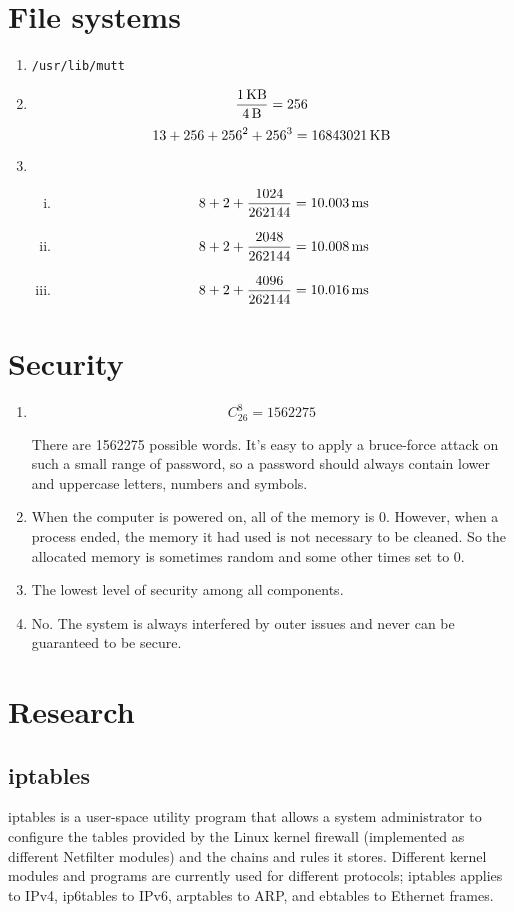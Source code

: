 \documentclass{article}
\newcommand{\unit}[1]{{\rm\,#1}}
\begin{document}
\section{File systems}
\begin{enumerate}
\item
\texttt{/usr/lib/mutt}
\item
$$\frac{1\unit{KB}}{4\unit{B}}=256$$
$$13+256+256^2+256^3=16843021\unit{KB}$$
\item
\begin{enumerate}[(i)]
\item $$8+2+\frac{1024}{262144}=10.003\unit{ms}$$
\item $$8+2+\frac{2048}{262144}=10.008\unit{ms}$$
\item $$8+2+\frac{4096}{262144}=10.016\unit{ms}$$
\end{enumerate}
\end{enumerate}

\section{Security}
\begin{enumerate}
\item
$$C_{26}^8=1562275$$

There are 1562275 possible words. It's easy to apply a bruce-force attack on such a small range of password, so a
password should always contain lower and uppercase letters, numbers and symbols.
\item
When the computer is powered on, all of the memory is 0. However, when a process ended, the memory it had used is not necessary to be cleaned. So the allocated memory is sometimes random and some other times set to 0.
\item
The lowest level of security among all components.
\item
No. The system is always interfered by outer issues and never can be guaranteed to be secure.
\end{enumerate}

\section{Research}
\subsection*{iptables}
iptables is a user-space utility program that allows a system administrator to configure the tables provided by the Linux kernel firewall (implemented as different Netfilter modules) and the chains and rules it stores. Different kernel modules and programs are currently used for different protocols; iptables applies to IPv4, ip6tables to IPv6, arptables to ARP, and ebtables to Ethernet frames.
\end{document}
